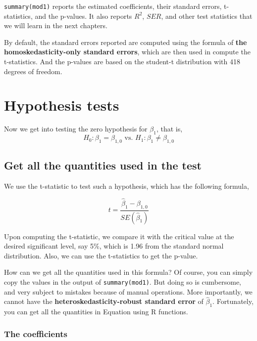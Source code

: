 \documentclass[11pt]{article}
\begin{document}
\texttt{summary(mod1)} reports the estimated coefficients, their standard
errors, t-statistics, and the p-values. It also reports \(R^2\),
\(SER\), and other test statistics that we will learn in the next
chapters.

By default, the standard errors reported are computed using
the formula of \textbf{the homoskedasticity-only standard errors}, which are
then used in compute the t-statistics. And the p-values are based on
the student-t distribution with 418 degrees of freedom.


\section{Hypothesis tests}
\label{sec:org77e4951}

Now we get into testing the zero hypothesis for \(\beta_1\), that is,
\[ H_0: \beta_1 = \beta_{1,0} \text{ vs. } H_1: \beta_1 \neq
\beta_{1,0} \]


\subsection{Get all the quantities used in the test}
\label{sec:orgcc97ee9}

We use the t-statistic to test such a hypothesis, which has the
following formula,

\begin{equation}
\label{eq:t-stat-b1}
t = \frac{\hat{\beta}_1 - \beta_{1,0}}{SE(\hat{\beta}_1)}
\end{equation}

Upon computing the t-statistic, we compare it with the critical value
at the desired significant level, say 5\%, which is 1.96 from the
standard normal distribution. Also, we can use the t-statistics to get
the p-value.

How can we get all the quantities used in this formula? Of course, you
can simply copy the values in the output of \texttt{summary(mod1)}. But doing
so is cumbersome, and very subject to mistakes because of manual
operations. More importantly, we cannot have the
\textbf{heteroskedasticity-robust standard error} of
\(\hat{\beta}_1\). Fortunately, you can get all the quantities in
Equation  using R functions.

\subsubsection*{The coefficients}
\label{sec:orgb9f0e9f}
\end{document}

